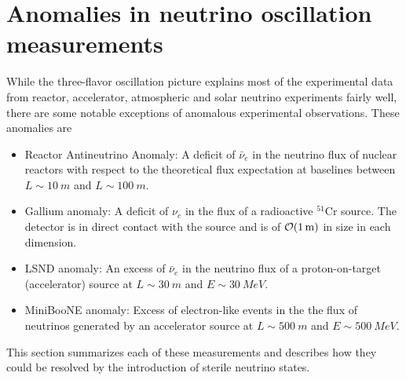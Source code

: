 \section{Anomalies in neutrino oscillation measurements}
While the three-flavor oscillation picture explains most of the experimental data from reactor, accelerator, atmospheric and solar neutrino experiments fairly well, there are some notable exceptions of anomalous experimental observations. These anomalies are
\begin{itemize}
    \item Reactor Antineutrino Anomaly: A deficit of $\bar{\nu}_e$ in the neutrino flux of nuclear reactors with respect to the theoretical flux expectation at baselines between $L\sim\SI{10}{m}$ and $L\sim\SI{100}{m}$.
    \item Gallium anomaly: A deficit of $\nu_e$ in the flux of a radioactive $^{51}\mathrm{Cr}$ source. The detector is in direct contact with the source and is of $\order{\SI{1}{m}}$ in size in each dimension.
    \item LSND anomaly: An excess of $\bar{\nu}_e$ in the neutrino flux of a proton-on-target (accelerator) source at $L\sim\SI{30}{m}$ and $E\sim\SI{30}{MeV}$.
    \item MiniBooNE anomaly: Excess of electron-like events in the the flux of neutrinos generated by an accelerator source at $L\sim\SI{500}{m}$ and $E\sim\SI{500}{MeV}$.
\end{itemize}
This section summarizes each of these measurements and describes how they could be resolved by the introduction of sterile neutrino states.

